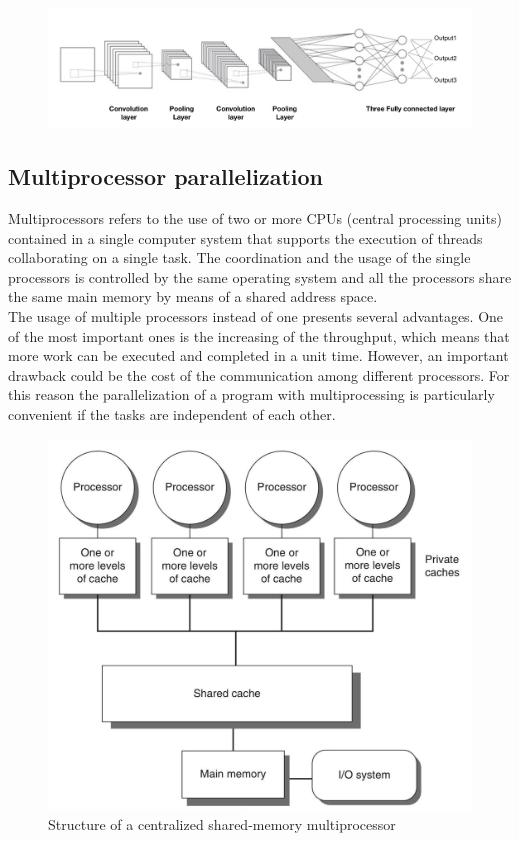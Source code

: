 \documentclass{usiinftr}
\begin{document}
\begin{figure}[h]
	\centering
	\includegraphics[width=0.98\linewidth]{img/cnn_gen}
	\caption{}
	\label{fig:cnngen}
\end{figure}



\subsection{Multiprocessor parallelization}
Multiprocessors refers to the use of two or more CPUs (central processing units) contained in a single computer system that supports the execution of threads collaborating on a single task. The coordination and the usage of the single processors is controlled by the same operating system and all the processors share the same main memory by means of a shared address space.  \\
The usage of multiple processors instead of one presents several advantages. One of the most important ones is the increasing of the  throughput, which means that more work can be executed and completed in a unit time. However, an important drawback could be the cost of the communication among different processors. For this reason the parallelization of a program with multiprocessing is particularly convenient if the tasks are independent of each other.

\begin{figure}[h]
	\centering
	\includegraphics[width=0.5\linewidth]{img/multiprocessing}
	\caption{Structure of a centralized shared-memory multiprocessor \cite{13}}
	\label{fig:3}
\end{figure}
\end{document}
